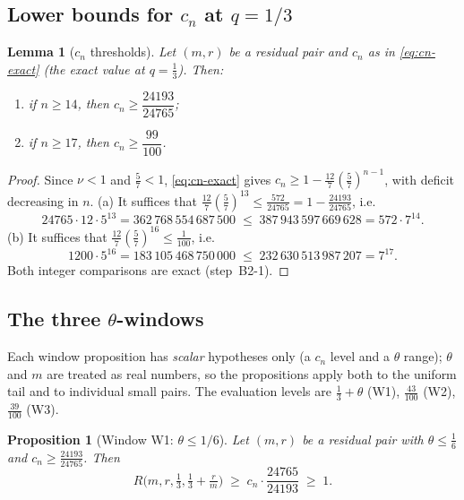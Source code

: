 \documentclass[11pt]{article}
\newtheorem{lemma}[theorem]{Lemma}
\newtheorem{proposition}[theorem]{Proposition}
\theoremstyle{remark}
\theoremstyle{plain}
\theoremstyle{plain}
\begin{document}
\subsection{Lower bounds for $c_n$ at $q=1/3$}\label{sec:cn}

\begin{lemma}[$c_n$ thresholds]\label{lem:cnthr}
Let $(m,r)$ be a residual pair and $c_n$ as in \eqref{eq:cn-exact} (the exact value at $q=\tfrac13$).  Then:
\begin{enumerate}[label=\textup{(\alph*)}]
\item if $n\ge14$, then $c_n\ge\dfrac{24193}{24765}$;
\item if $n\ge17$, then $c_n\ge\dfrac{99}{100}$.
\end{enumerate}
\end{lemma}

\begin{proof}
Since $\nu<1$ and $\tfrac57<1$, \eqref{eq:cn-exact} gives $c_n\ge1-\tfrac{12}7(\tfrac57)^{n-1}$, with deficit decreasing in $n$.
(a) It suffices that $\tfrac{12}7(\tfrac57)^{13}\le\tfrac{572}{24765}=1-\tfrac{24193}{24765}$, i.e.
\[
        24765\cdot12\cdot5^{13}
        =362\,768\,554\,687\,500\;\le\;387\,943\,597\,669\,628
        =572\cdot7^{14}.
\]
(b) It suffices that $\tfrac{12}7(\tfrac57)^{16}\le\tfrac1{100}$, i.e.
\[
        1200\cdot5^{16}=183\,105\,468\,750\,000\;\le\;232\,630\,513\,987\,207=7^{17}.
\]
Both integer comparisons are exact (step~B2-1).
\end{proof}

\subsection{The three $\theta$-windows}\label{sec:windows}

Each window proposition has \emph{scalar} hypotheses only (a $c_n$ level and a $\theta$ range); $\theta$ and $m$ are treated as real numbers, so the propositions apply both to the uniform tail and to individual small pairs.  The evaluation levels are $\tfrac13+\theta$ (W1), $\tfrac{43}{100}$ (W2), $\tfrac{39}{100}$ (W3).

\begin{proposition}[Window W1: $\theta\le1/6$]\label{prop:W1}
Let $(m,r)$ be a residual pair with $\theta\le\tfrac16$ and $c_n\ge\tfrac{24193}{24765}$.  Then
\[
        R\bigl(m,r,\tfrac13,\tfrac13+\tfrac rm\bigr)\;\ge\;
        c_n\cdot\frac{24765}{24193}\;\ge\;1 .
\]
\end{proposition}
\end{document}
